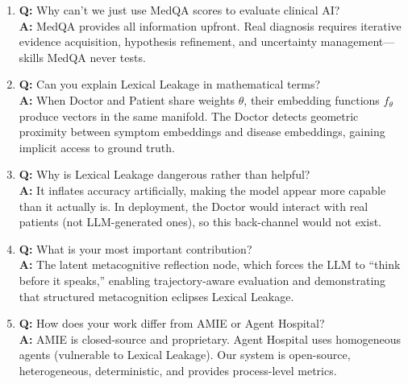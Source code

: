 \begin{vivabox}[\textcolor{white}{Likely Viva Questions}]
\begin{enumerate}
    \item \textbf{Q:} Why can't we just use MedQA scores to evaluate clinical AI?\\
    \textbf{A:} MedQA provides all information upfront. Real diagnosis requires iterative evidence acquisition, hypothesis refinement, and uncertainty management---skills MedQA never tests.
    
    \item \textbf{Q:} Can you explain Lexical Leakage in mathematical terms?\\
    \textbf{A:} When Doctor and Patient share weights $\theta$, their embedding functions $f_\theta$ produce vectors in the same manifold. The Doctor detects geometric proximity between symptom embeddings and disease embeddings, gaining implicit access to ground truth.
    
    \item \textbf{Q:} Why is Lexical Leakage dangerous rather than helpful?\\
    \textbf{A:} It inflates accuracy artificially, making the model appear more capable than it actually is. In deployment, the Doctor would interact with real patients (not LLM-generated ones), so this back-channel would not exist.
    
    \item \textbf{Q:} What is your most important contribution?\\
    \textbf{A:} The latent metacognitive reflection node, which forces the LLM to ``think before it speaks,'' enabling trajectory-aware evaluation and demonstrating that structured metacognition eclipses Lexical Leakage.
    
    \item \textbf{Q:} How does your work differ from AMIE or Agent Hospital?\\
    \textbf{A:} AMIE is closed-source and proprietary. Agent Hospital uses homogeneous agents (vulnerable to Lexical Leakage). Our system is open-source, heterogeneous, deterministic, and provides process-level metrics.
\end{enumerate}
\end{vivabox}
